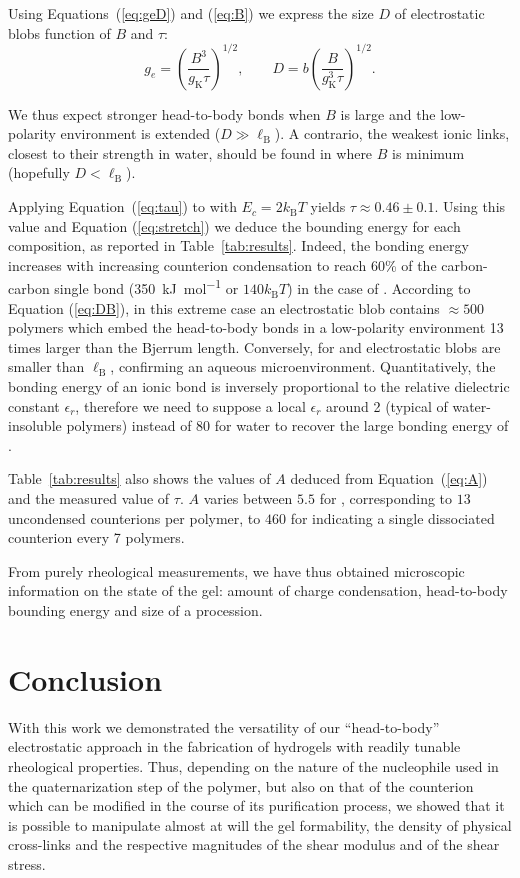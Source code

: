 \documentclass[journal=jacsat,manuscript=article]{achemso}
\begin{document}
Using Equations~(\ref{eq:geD}) and (\ref{eq:B}) we express the size $D$ of electrostatic blobs function of $B$ and $\tau$:
\begin{equation}
g_e = \left(\frac{B^3}{g_\mathrm{K}\tau}\right)^{1/2},\qquad 
D = b\left(\frac{B}{g_\mathrm{K}^3\tau}\right)^{1/2}.
\label{eq:DB}
\end{equation}

We thus expect stronger head-to-body bonds when $B$ is large and the low-polarity environment is extended ($D\gg\ell_\mathrm{B}$). A contrario, the weakest ionic links, closest to their strength in water, should be found in  where $B$ is minimum (hopefully $D<\ell_\mathrm{B}$).

Applying Equation~(\ref{eq:tau}) to  with $E_c = 2 k_\mathrm{B}T$ yields $\tau \approx 0.46\pm 0.1$. Using this value and Equation (\ref{eq:stretch}) we deduce the bounding energy for each composition, as reported in Table~\ref{tab:results}. Indeed, the bonding energy increases with increasing counterion condensation to reach 60\% of the carbon-carbon single bond (\SI{350}{\kilo\joule\per\mole} or $140 k_\mathrm{B}T$) in the case of . According to Equation (\ref{eq:DB}), in this extreme case an electrostatic blob contains $\approx 500$ polymers which embed the head-to-body bonds in a low-polarity environment 13 times larger than the Bjerrum length. Conversely, for  and  electrostatic blobs are smaller than $\ell_\mathrm{B}$, confirming an aqueous microenvironment. Quantitatively, the bonding energy of an ionic bond is inversely proportional to the relative dielectric constant $\epsilon_r$, therefore we need to suppose a local $\epsilon_r$ around 2 (typical of water-insoluble polymers) instead of 80 for water to recover the large bonding energy of .

Table~\ref{tab:results} also shows the values of $A$ deduced from Equation~(\ref{eq:A}) and the measured value of $\tau$. $A$ varies between $5.5$ for , corresponding to $13$ uncondensed counterions per polymer, to $460$ for  indicating a single dissociated counterion every 7 polymers.

From purely rheological measurements, we have thus obtained microscopic information on the state of the gel: amount of charge condensation, head-to-body bounding energy and size of a procession.




\section{Conclusion}
With this work we demonstrated the versatility of our ``head-to-body'' electrostatic approach in the fabrication of hydrogels with readily tunable rheological properties. Thus, depending on the nature of the nucleophile used in the quaternarization step of the polymer, but also on that of the counterion which can be modified in the course of its purification process, we showed that it is possible to manipulate almost at will the gel formability, the density of physical cross-links and the respective magnitudes of the shear modulus and of the shear stress. 
\end{document}
